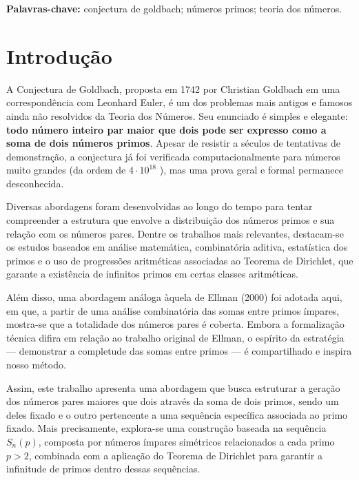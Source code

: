 \documentclass[a4paper,11pt]{article}
\theoremstyle{definition}
\theoremstyle{remark}
\begin{document}
	\textbf{Palavras-chave:} conjectura de goldbach; números primos; teoria dos números.
	
	
	\begin{otherlanguage}{brazil}
	\section{Introdução}

	A Conjectura de Goldbach, proposta em 1742 por Christian Goldbach em uma correspondência com Leonhard Euler, é um dos problemas mais antigos e famosos ainda não resolvidos da Teoria dos Números. Seu enunciado é simples e elegante: \textbf{todo número inteiro par maior que dois pode ser expresso como a soma de dois números primos}. Apesar de resistir a séculos de tentativas de demonstração, a conjectura já foi verificada computacionalmente para números muito grandes (da ordem de \(4 \cdot 10^{18} \) )\cite{oliveira}, mas uma prova geral e formal permanece desconhecida.
	
	Diversas abordagens foram desenvolvidas ao longo do tempo para tentar compreender a estrutura que envolve a distribuição dos números primos e sua relação com os números pares. Dentre os trabalhos mais relevantes, destacam-se os estudos baseados em análise matemática, combinatória aditiva, estatística dos primos e o uso de progressões aritméticas associadas ao Teorema de Dirichlet, que garante a existência de infinitos primos em certas classes aritméticas. 
	
	Além disso, uma abordagem análoga àquela de Ellman (2000)\cite{Ellman2000} foi adotada aqui, em que, a partir de uma análise combinatória das somas entre primos ímpares, mostra-se que a totalidade dos números pares é coberta. Embora a formalização técnica difira em relação ao trabalho original de Ellman, o espírito da estratégia — demonstrar a completude das somas entre primos — é compartilhado e inspira nosso método.
	
	Assim, este trabalho apresenta uma abordagem que busca estruturar a geração dos números pares maiores que dois através da soma de dois primos, sendo um deles fixado e o outro pertencente a uma sequência específica associada ao primo fixado. Mais precisamente, explora-se uma construção baseada na sequência \(S_n(p)\), composta por números ímpares simétricos relacionados a cada primo \(p > 2\), combinada com a aplicação do Teorema de Dirichlet para garantir a infinitude de primos dentro dessas sequências.
	

\end{otherlanguage}
\end{document}
